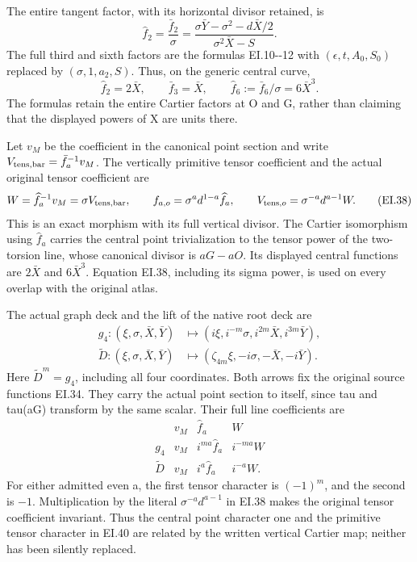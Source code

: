 The entire tangent factor, with its horizontal divisor retained, is
\[
 \widehat f_{2}=\frac{\bar f_2}{\sigma}
  =\frac{\sigma\bar Y-\sigma^2-d\bar X/2}
             {\sigma^2\bar X-S}.
 \tag{EI.36}
\]
The full third and sixth factors are the formulas EI.10-\/-12 with
\((\epsilon,t,A_0,S_0)\) replaced by
\((\sigma,1,a_2,S)\). Thus, on the generic central curve,
\[
 \widehat f_2=2\bar X,\qquad
 \bar f_3=\bar X,\qquad
 \widehat f_6:=\bar f_6/\sigma=6\bar X^3.
 \tag{EI.37}
\]
The formulas retain the entire Cartier factors at O and G, rather than
claiming that the displayed powers of X are units there.

Let \(v_M\) be the coefficient in the canonical point section and
write \(V_{\rm tens,bar}=\bar f_a^{-1}v_M\). The vertically primitive
tensor coefficient and the actual original tensor coefficient are
\[
 W=\widehat f_a^{-1}v_M=\sigma V_{\rm tens,bar},\qquad
 f_{a,o}=\sigma^a d^{1-a}\widehat f_a,\qquad
 V_{{\rm tens},o}=\sigma^{-a}d^{a-1}W.
 \tag{EI.38}
\]
This is an exact morphism with its full vertical divisor. The
Cartier isomorphism using \(\widehat f_a\) carries the central point
trivialization to the tensor power of the two-torsion line, whose
canonical divisor is \(aG-aO\). Its displayed central functions are
\(2\bar X\) and \(6\bar X^3\). Equation EI.38, including its
sigma power, is used on every overlap with the original atlas.

The actual graph deck and the lift of the native root deck are
\[
 \begin{aligned}
 g_4:(\xi,\sigma,\bar X,\bar Y)&\longmapsto
  (i\xi,i^{-m}\sigma,i^{2m}\bar X,i^{3m}\bar Y),\\
 \widetilde D:(\xi,\sigma,\bar X,\bar Y)&\longmapsto
  (\zeta_{4m}\xi,-i\sigma,-\bar X,-i\bar Y).
 \end{aligned}
 \tag{EI.39}
\]
Here \(\widetilde D^m=g_4\), including all four coordinates.
Both arrows fix the original source functions EI.34. They carry
the actual point section to itself, since tau and tau(aG) transform
by the same scalar. Their full line coefficients are
\[
 \begin{array}{c|ccc}
 &v_M&\widehat f_a&W\\ \hline
 g_4&v_M&i^{ma}\widehat f_a&i^{-ma}W\\
 \widetilde D&v_M&i^a\widehat f_a&i^{-a}W .
 \end{array}
 \tag{EI.40}
\]
For either admitted even a, the first tensor character is
\((-1)^m\), and the second is \(-1\). Multiplication by the
literal \(\sigma^{-a}d^{a-1}\) in EI.38 makes the original
tensor coefficient invariant. Thus the central point character one
and the primitive tensor character in EI.40 are related by the
written vertical Cartier map; neither has been silently replaced.

